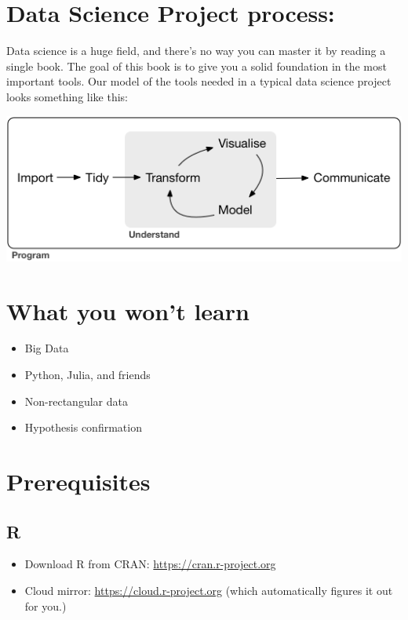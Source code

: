 \documentclass[]{book}
\providecommand{\tightlist}{%
  \setlength{\itemsep}{0pt}\setlength{\parskip}{0pt}}
\begin{document}
\hypertarget{data-science-project-process}{%
\section{Data Science Project process:}\label{data-science-project-process}}

Data science is a huge field, and there's no way you can master it by reading a single book. The goal of this book is to give you a solid foundation in the most important tools. Our model of the tools needed in a typical data science project looks something like this:

\begin{center}\includegraphics[width=1\linewidth]{images/data-science} \end{center}

\hypertarget{what-you-wont-learn}{%
\section{What you won't learn}\label{what-you-wont-learn}}

\begin{itemize}
\tightlist
\item
  Big Data
\item
  Python, Julia, and friends
\item
  Non-rectangular data
\item
  Hypothesis confirmation
\end{itemize}

\hypertarget{prerequisites}{%
\section{Prerequisites}\label{prerequisites}}

\hypertarget{r}{%
\subsection{R}\label{r}}

\begin{itemize}
\tightlist
\item
  Download R from CRAN: \url{https://cran.r-project.org}
\item
  Cloud mirror: \url{https://cloud.r-project.org} (which automatically figures it out for you.)
\end{itemize}
\end{document}

